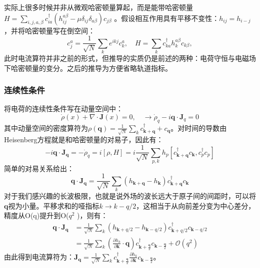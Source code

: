 \documentclass[10pt,openany]{book}
\theoremstyle{thmstyle} %
\theoremstyle{defstyle} %
\theoremstyle{prostyle} %
\begin{document}
实际上很多时候并非从微观哈密顿量算起，而是能带哈密顿量$ H=\sum_{i, j, a, \beta} c_{i a}^{\dagger}\left(h_{i j}^{a \beta}-\mu \delta_{i j} \delta_{a \beta}\right) c_{j \beta} $ 。假设相互作用具有平移不变性：$ h_{i j}=h_{i-j} $，并将哈密顿量写在倒空间：
\begin{equation}
	c_j^a=\frac{1}{\sqrt{N}} \sum_k e^{i k j} c_k^a, \quad H=\sum_k c_{k a}^{\dagger} h_k^{a \beta} c_{k \beta},
\end{equation} 
此时电流算符并非之前的形式，但推导的实质仍是前述的两种：电荷守恒与电磁场下哈密顿量的变分。之后的推导为方便省略轨道指标。
\subsubsection*{连续性条件}
将电荷的连续性条件写在动量空间中：
\begin{equation}
	\dot{\rho}(x)+\nabla \cdot \mathbf{J}(x)=0, \quad \rightarrow \dot{\rho}_q-i \mathbf{q} \cdot \mathbf{J}_q=0
\end{equation}
其中动量空间的密度算符为$ \rho(\mathbf{q})=\frac{1}{\sqrt{N}}\sum_k c^\dagger_{\mathbf{k}+\mathbf{q}}+c_{\mathbf{q}} $。对时间的导数由Heisenberg方程就是和哈密顿量的对易子，因此有：
\begin{equation}
	-i \mathbf{q} \cdot \mathbf{J}_{\mathbf{q}}=-\dot{\rho}_q=i[\rho, H]=i \frac{1}{\sqrt{N}} \sum_{p, k} h_p\left[c_{\mathbf{k}+\mathbf{q}}^{\dagger} c_{\mathbf{k}}, c_p^{\dagger} c_p\right]
\end{equation}
简单的对易关系给出：
\begin{equation}
	\mathbf{q} \cdot \mathbf{J}_{\mathbf{q}}=\frac{1}{\sqrt{N}} \sum_{ k}\left(h_{\mathbf{k}+\mathbf{q}}-h_{\mathbf{k}}\right) c_{\mathbf{k}+\mathbf{q}}^{\dagger} c_{\mathbf{k}}
\end{equation}
对于我们感兴趣的长波极限，也就是说外场的波长远大于原子间的间距时，可以将$ \mathbf{q} $视为小量。平移求和的哑指标$ k\to k-q/2 $，这相当于从向前差分变为中心差分，精度从O(q)提升到O($ q^2 $ )，则有：
\begin{equation}
	\begin{aligned}
		\mathbf{q} \cdot \mathbf{J}_{\mathbf{q}} & =\frac{1}{\sqrt{N}} \sum_{ k}\left(h_{\mathbf{k}+q / 2}-h_{\mathbf{k}-q / 2}\right) c_{\mathbf{k}+q / 2}^{\dagger} c_{\mathbf{k}-q / 2} \\
		& =\frac{1}{\sqrt{N}} \sum_{ k}\left(\frac{\partial h_k}{\partial \mathbf{k}} \cdot \mathbf{q}\right) c_{\mathbf{k}+\frac{\mathbf{q}}{2}}^{\dagger} c_{\mathbf{k}-\frac{\mathbf{q}}{2}}+\mathcal{O}\left(q^2\right)
		\end{aligned}
\end{equation} 
由此得到电流算符为：$ \mathbf{J}_{\mathbf{q}}= \frac{1}{\sqrt{N}} \sum_{ k} c_{\mathbf{k}+\frac{\mathbf{q}}{2}}^{\dagger} \frac{\partial h_k}{\partial \mathbf{k}} c_{\mathbf{k}-\frac{\mathbf{q}}{2}}$。
\end{document}
